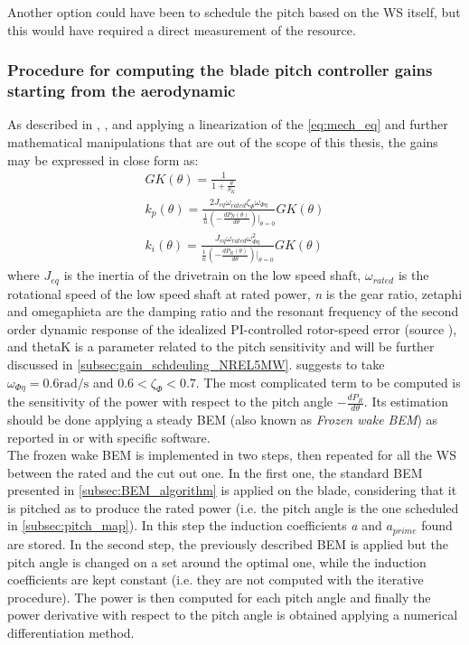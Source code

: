Another option could have been to schedule the pitch based on the \acrshort{WS} itself, but this would have required a direct measurement of the resource. 

\subsubsection[With scheduling from aerodynamic]{Procedure for computing the blade pitch controller gains starting from the aerodynamic}\label{subsec:gain_schdeuling_aero}
As described in \cite{Aerodynamics_of_wind_turbines}, \cite{NREL_5MW_reference}, and \cite{ris_r_1500} applying a linearization of the \autoref{eq:mech_eq} and further mathematical manipulations that are out of the scope of this thesis,  the gains may be expressed in close form as:
\begin{gather}
    GK(\theta) = \frac{1}{1+\frac{\theta}{\theta_K}} \label{eq:GK}\\
    k_p(\theta) = \frac{2J_{eq}\omega_{rated}\zeta_{\Phi}\omega_{\Phi\eta}}{\frac{1}{n}\left(-\frac{dP_R(\theta)}{d\theta}\right)\vert_{\theta=0}}GK(\theta)
    \label{eq:kp}\\
    k_i(\theta) = \frac{J_{eq}\omega_{rated}\omega_{\Phi\eta}^2}{\frac{1}{n}\left(-\frac{dP_R(\theta)}{d\theta}\right)\vert_{\theta=0}}GK(\theta)
    \label{eq:ki}
\end{gather}
where $J_{eq}$ is the inertia of the drivetrain on the low speed shaft, $\omega_{rated}$ is the rotational speed of the low speed shaft at rated power, \textit{n} is the gear ratio, \acrshort{zetaphi} and \acrshort{omegaphieta} are the damping ratio and the resonant frequency of the second order dynamic response of the idealized PI-controlled rotor-speed error (source \cite{NREL_5MW_reference}), and \acrshort{thetaK} is a parameter related to the pitch sensitivity and will be further discussed in \autoref{subsec:gain_schdeuling_NREL5MW}. \cite{NREL_5MW_reference} suggests to take $\omega_{\Phi\eta}=0.6\si{\radian\per\second}$ and $0.6<\zeta_{\Phi}<0.7$. The most complicated term to be computed is the sensitivity of the power with respect to the pitch angle $-\frac{dP_R}{d\theta}$. Its estimation should be done applying a steady \acrshort{BEM} (also known as \textit{Frozen wake BEM}) as reported in \cite{Aerodynamics_of_wind_turbines} or with specific software. \\
The frozen wake BEM is implemented in two steps, then repeated for all the \acrshort{WS} between the rated and the cut out one. In the first one, the standard BEM presented in \autoref{subsec:BEM_algorithm} is applied on the blade, considering that it is pitched as to produce the rated power (i.e. the pitch angle is the one scheduled in \autoref{subsec:pitch_map}). In this step the induction coefficients \textit{a} and \textit{$a_{prime}$} found are stored. In the second step, the previously described BEM is applied but the pitch angle is changed on a set around the optimal one, while the induction coefficients are kept constant (i.e. they are not computed with the iterative procedure). The power is then computed for each pitch angle and finally the power derivative with respect to the pitch angle is obtained applying a numerical differentiation method.

